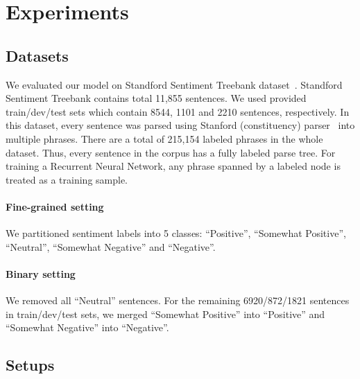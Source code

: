 \section{Experiments}
\subsection{Datasets}\label{sec:sst}
We evaluated our model on Standford Sentiment Treebank dataset~\cite{socher2013recursive}.
Standford Sentiment Treebank contains total 11,855 sentences.
We used provided train/dev/test sets which contain 8544, 1101 and 2210 sentences, respectively.
In this dataset, every sentence was parsed using Stanford (constituency) parser~\cite{socher2013recursive} into multiple phrases.
There are a total of 215,154 labeled phrases in the whole dataset. Thus, every sentence in the corpus has a fully labeled parse tree.
For training a Recurrent Neural Network, any phrase spanned by a labeled node is treated as a training sample.


\paragraph{Fine-grained setting} We partitioned sentiment labels into 5 classes: ``Positive'', ``Somewhat Positive'', ``Neutral'', ``Somewhat Negative'' and ``Negative''.

\paragraph{Binary setting} We removed all ``Neutral'' sentences.
For the remaining 6920/872/1821 sentences in train/dev/test sets, we merged ``Somewhat Positive'' into ``Positive'' and ``Somewhat Negative'' into ``Negative''.

\subsection{Setups}
